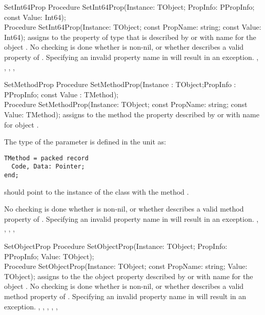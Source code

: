 \begin{procedure}{SetInt64Prop}
\Declaration
Procedure SetInt64Prop(Instance: TObject; PropInfo: PPropInfo; const Value: Int64);\\
Procedure SetInt64Prop(Instance: TObject; const PropName: string; const Value: Int64);
\Description
{} assigns  to the property of type
 that is described by  or with name  
for the object .
\Errors
No checking is done whether  is non-nil, or whether
 describes a valid  property of .
Specifying an invalid property name in  will result in an
 exception.
\SeeAlso
{}, , , ,
\end{procedure}

\begin{procedure}{SetMethodProp}
\Declaration
Procedure SetMethodProp(Instance : TObject;PropInfo : PPropInfo; const Value :
TMethod);\\
Procedure SetMethodProp(Instance: TObject; const PropName: string; const Value: TMethod);
\Description
{} assigns  to the method the property described 
by  or with name  for object .

The type  of the  parameter is defined in the
 unit as:
\begin{verbatim}
TMethod = packed record
  Code, Data: Pointer;
end;                                                                         
\end{verbatim}
 should point to the instance of the class with the method .

\Errors
No checking is done whether  is non-nil, or whether
 describes a valid method property of .
Specifying an invalid property name in  will result in an
 exception.
\SeeAlso
{}, , ,
, 
\end{procedure}

\begin{procedure}{SetObjectProp}
\Declaration
Procedure SetObjectProp(Instance: TObject; 
                        PropInfo: PPropInfo; Value: TObject);\\
Procedure SetObjectProp(Instance: TObject; 
                        const PropName: string; Value: TObject);                        
\Description
{} assigns  to the the object property described by
 or with name  for the object . 
\Errors
No checking is done whether  is non-nil, or whether
 describes a valid method property of .
Specifying an invalid property name in  will result in an
 exception.
\SeeAlso
{}, , ,
, , 
\end{procedure}

